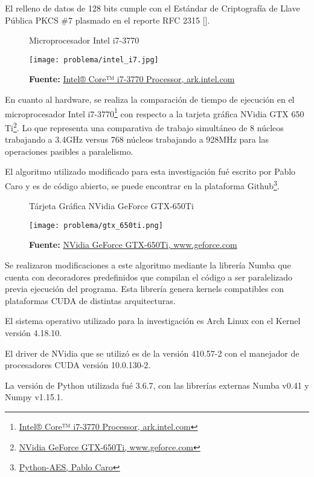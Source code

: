 \documentclass[../main/main.tex]{subfiles}
\begin{document}
  El relleno de datos de 128 bits cumple con el Estándar de Criptografía de Llave Pública PKCS \#7 plasmado en el reporte RFC 2315 [\cite{report:RFC_2315}].

  \begin{figure}[H]
    \centering
    \caption{Microprocesador Intel i7-3770}
    \texttt{[image: problema/intel\_i7.jpg]}
    \caption*{\textbf{Fuente:} \href{https://tinyurl.com/yb3tqpvu}{Intel® Core™ i7-3770 Processor, ark.intel.com}}
  \end{figure}

  En cuanto al hardware, se realiza la comparación de tiempo de ejecución en el microprocesador Intel i7-3770\footnote{\href{https://tinyurl.com/yb3tqpvu}{Intel® Core™ i7-3770 Processor, ark.intel.com}} con respecto a la tarjeta gráfica NVidia GTX 650 Ti\footnote{\href{https://tinyurl.com/ycr3kouv}{NVidia GeForce GTX-650Ti, www.geforce.com}}. Lo que representa una comparativa de trabajo simultáneo de 8 núcleos trabajando a 3.4GHz versus 768 núcleos trabajando a 928MHz para las operaciones pasibles a paralelismo.

  El algoritmo utilizado modificado para esta investigación fué escrito por Pablo Caro y es de código abierto, se puede encontrar en la plataforma Github\footnote{\href{https://github.com/pcaro90/Python-AES}{Python-AES, Pablo Caro}}.

  \begin{figure}[H]
    \centering
    \caption{Tárjeta Gráfica NVidia GeForce GTX-650Ti}
    \texttt{[image: problema/gtx\_650ti.png]}
    \caption*{\textbf{Fuente:} \href{https://tinyurl.com/ycr3kouv}{NVidia GeForce GTX-650Ti, www.geforce.com}}
  \end{figure}

  Se realizaron modificaciones a este algoritmo mediante la librería Numba que cuenta con decoradores predefinidos que compilan el código a ser paralelizado previa ejecución del programa. Esta librería genera kernels compatibles con plataformas CUDA de distintas arquitecturas.

  El sistema operativo utilizado para la investigación es Arch Linux con el Kernel versión 4.18.10.

  El driver de NVidia que se utilizó es de la versión 410.57-2 con el manejador de procesadores CUDA versión 10.0.130-2.

  La versión de Python utilizada fué 3.6.7, con las librerías externas Numba v0.41 y Numpy v1.15.1.
\end{document}
